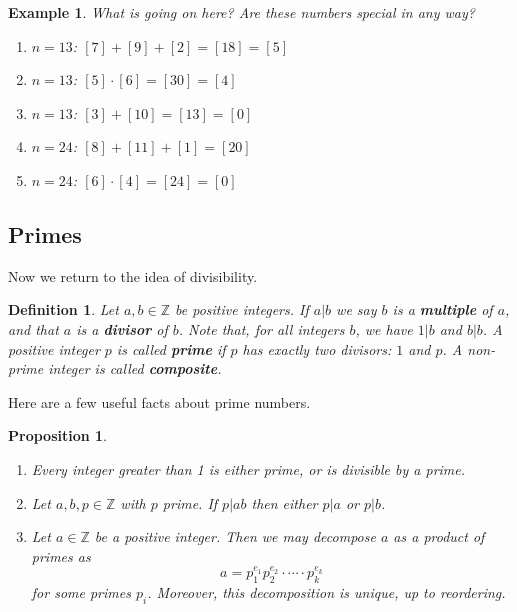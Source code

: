 \documentclass{article}
\newcommand{\Z}{\mathbb{Z}}
\theoremstyle{plain}
\newtheorem{definition}{Definition}
\newtheorem{example}{Example}
\newtheorem{proposition}{Proposition}
\begin{document}
\begin{example}
    What is going on here?
    Are these numbers special in any way?
\begin{enumerate}
    \item $n=13$: $[7]+[9]+[2] = [18] = [5]$
    \item $n=13$: $[5]\cdot[6] = [30] = [4]$
    \item $n=13$: $[3]+[10] = [13] = [0]$
    
    \item $n=24$: $[8]+[11]+[1] = [20]$
    \item $n=24$: $[6]\cdot[4] = [24] = [0]$
\end{enumerate}
\end{example}






\subsection{Primes}

Now we return to the idea of divisibility.
\begin{definition}
    Let $a,b \in \Z$ be positive integers.
    If $a|b$ we say $b$ is a \textbf{multiple} of $a$, and that 
    $a$ is a \textbf{divisor} of $b$.
    Note that, for all integers $b$, we have $1|b$ and $b|b$.
    A positive integer $p$ is called \textbf{prime} if $p$ has exactly 
    two divisors: $1$ and $p$.
    A non-prime integer is called \textbf{composite}.
\end{definition}


Here are a few useful facts about prime numbers.

\begin{proposition}
\begin{enumerate}
    \item 
    Every integer greater than 1 is either prime, or is divisible by a prime.

    \item 
    Let $a,b,p\in\Z$ with $p$ prime.
    If $p|ab$ then either $p|a$ or $p|b$.

    \item 
    Let $a\in\Z$ be a positive integer.
    Then we may decompose $a$ as a product of primes as 
    \[
        a = p_1^{e_1} p_2^{e_2} \cdot \cdots \cdot p_k^{e_k}
    \]
    for some primes $p_i$.
    Moreover, this decomposition is unique, up to reordering.
\end{enumerate}
\end{proposition}
\end{document}
